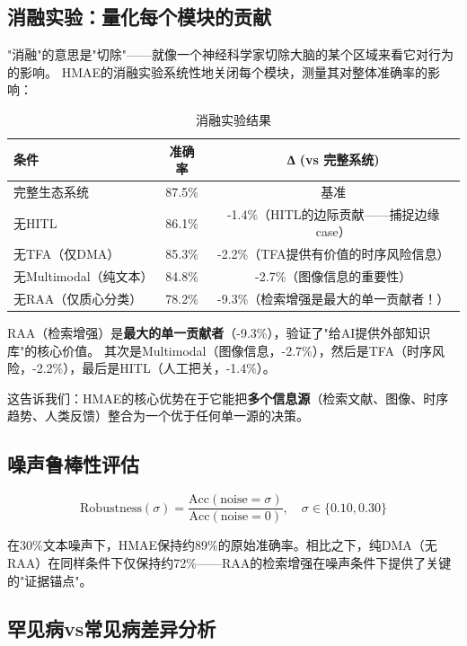 \documentclass[11pt,a4paper]{ctexart}
\begin{document}
\subsection{消融实验：量化每个模块的贡献}

"消融"的意思是"切除"——就像一个神经科学家切除大脑的某个区域来看它对行为的影响。
HMAE的消融实验系统性地关闭每个模块，测量其对整体准确率的影响：

\begin{table}[H]
\centering
\small
\begin{tabular}{lcc}
\toprule
\textbf{条件} & \textbf{准确率} & \textbf{∆ (vs 完整系统)} \\
\midrule
完整生态系统 & 87.5\% & 基准 \\
无HITL & 86.1\% & -1.4\%（HITL的边际贡献——捕捉边缘case） \\
无TFA（仅DMA） & 85.3\% & -2.2\%（TFA提供有价值的时序风险信息） \\
无Multimodal（纯文本） & 84.8\% & -2.7\%（图像信息的重要性） \\
无RAA（仅质心分类） & 78.2\% & -9.3\%（检索增强是最大的单一贡献者！） \\
\bottomrule
\end{tabular}
\caption{消融实验结果}
\end{table}

\begin{keybox}[消融实验的关键发现]
RAA（检索增强）是\textbf{最大的单一贡献者}（-9.3\%），验证了"给AI提供外部知识库"的核心价值。
其次是Multimodal（图像信息，-2.7\%），然后是TFA（时序风险，-2.2\%），最后是HITL（人工把关，-1.4\%）。

这告诉我们：HMAE的核心优势在于它能把\textbf{多个信息源}（检索文献、图像、时序趋势、人类反馈）整合为一个优于任何单一源的决策。
\end{keybox}

\subsection{噪声鲁棒性评估}

$$\text{Robustness}(\sigma) = \frac{\text{Acc}(\text{noise} = \sigma)}{\text{Acc}(\text{noise} = 0)}, \quad \sigma \in \{0.10, 0.30\}$$

在30\%文本噪声下，HMAE保持约89\%的原始准确率。相比之下，纯DMA（无RAA）在同样条件下仅保持约72\%——RAA的检索增强在噪声条件下提供了关键的"证据锚点"。

\subsection{罕见病vs常见病差异分析}
\end{document}
